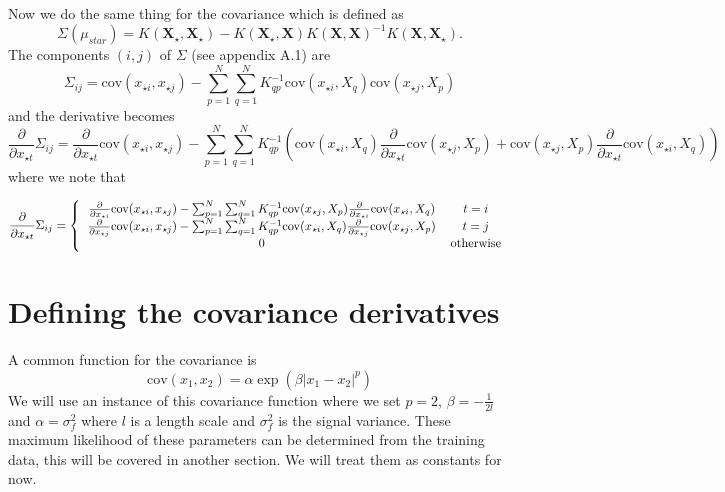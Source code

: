 \documentclass[phd,tocprelim]{cornell}
\begin{document}
Now we do the same thing for the covariance which is defined as
\begin{equation}
 \Sigma(\mu_{star}) = K(\textbf{X$_{\star}$}, \textbf{X$_{\star}$}) - K(\textbf{X$_{\star}$}, \textbf{X}) K(\textbf{X}, \textbf{X})^{-1} K(\textbf{X}, \textbf{X$_{\star}$}).
\end{equation}
The components $(i,j)$ of $\Sigma$ (see appendix A.1) are
\begin{equation}
 \Sigma_{ij} = \mbox{cov}(x_{\star i}, x_{\star j}) - \sum_{p = 1}^{N} \sum_{q = 1}^{N} K^{-1}_{qp} \mbox{cov}(x_{\star i}, X_{q}) \mbox{cov}(x_{\star j}, X_{p})
\end{equation}
and the derivative becomes
\begin{equation}
 \frac{\partial}{\partial x_{\star t}} \Sigma_{ij} = \frac{\partial}{\partial x_{\star t}} \mbox{cov}(x_{\star i}, x_{\star j}) - \sum_{p = 1}^{N} \sum_{q = 1}^{N} K^{-1}_{qp} \left( \mbox{cov}(x_{\star i}, X_{q}) \frac{\partial}{\partial x_{\star t}} \mbox{cov}(x_{\star j}, X_{p}) + \mbox{cov}(x_{\star j}, X_{p}) \frac{\partial}{\partial x_{\star t}} \mbox{cov}(x_{\star i}, X_{q}) \right)
\end{equation}
where we note that

\[
  \frac{\partial}{\partial x_{\star t}} \Sigma_{ij} = \left\{ \begin{tabular}{cc}
                                                       $\frac{\partial}{\partial x_{\star i}} \mbox{cov}(x_{\star i}, x_{\star j}) - \sum_{p = 1}^{N} \sum_{q = 1}^{N} K^{-1}_{qp} \mbox{cov}(x_{\star j}, X_{p}) \frac{\partial}{\partial x_{\star i}} \mbox{cov}(x_{\star i}, X_{q})$ & $t = i$ \\
							$\frac{\partial}{\partial x_{\star j}} \mbox{cov}(x_{\star i}, x_{\star j}) - \sum_{p = 1}^{N} \sum_{q = 1}^{N} K^{-1}_{qp} \mbox{cov}(x_{\star i}, X_{q}) \frac{\partial}{\partial x_{\star j}} \mbox{cov}(x_{\star j}, X_{p})$ & $t = j$ \\
							$0$ & otherwise
                                                      \end{tabular} \right.
\]


\section{Defining the covariance derivatives}

A common function for the covariance is
\begin{equation}
 \mbox{cov}(x_{1}, x_{2}) = \alpha \exp( \beta |x_{1} - x_{2}|^{p})
\end{equation}
We will use an instance of this covariance function where we set $p = 2$, $\beta = - \frac{1}{2l}$ and $\alpha = \sigma_{f}^{2}$ where $l$ is a length scale and $\sigma_{f}^{2}$ is the signal variance. These maximum likelihood of these parameters can be determined from the training data, this will be covered in another section. We will treat them as constants for now.
\end{document}
